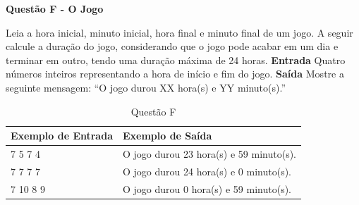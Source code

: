 \documentclass[a4paper, 12pt]{article}
\begin{document}
\newpage %
\begin{center}
\textbf{{\Large Questão F - O Jogo}}
\end{center}
\vspace{5pt}
Leia a hora inicial, minuto inicial, hora final e minuto final de um jogo. A seguir calcule a duração do jogo, considerando que o jogo pode acabar em um dia e terminar em outro, tendo uma duração máxima de 24 horas.
\newline \newline
\textbf{{\large Entrada}} \newline
Quatro números inteiros representando a hora de início e fim do jogo.
\newline \newline
\textbf{{\large Saída}} \newline
Mostre a seguinte mensagem: ``O jogo durou XX hora(s) e YY minuto(s).''
\newline
\begin{table}[H]
	\centering
	\begin{tabular}{|l|l|}
	\hline
	\textbf{Exemplo de Entrada} & \textbf{Exemplo de Saída} \\ \hline
	7 5 7 4 & O jogo durou 23 hora(s) e 59 minuto(s). \\ \hline
	7 7 7 7 & O jogo durou 24 hora(s) e 0 minuto(s). \\ \hline
	7 10 8 9 & O jogo durou 0 hora(s) e 59 minuto(s). \\ \hline
	\end{tabular}
	\caption{Questão F}
	\label{tabela6}
\end{table}
\end{document}
